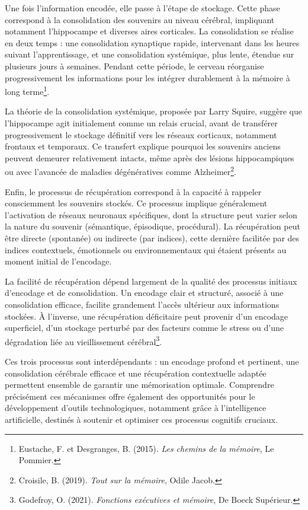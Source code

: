 \documentclass[12pt,a4paper]{report}
\begin{document}
Une fois l’information encodée, elle passe à l'étape de stockage. Cette phase correspond à la consolidation des souvenirs au niveau cérébral, impliquant notamment l'hippocampe et diverses aires corticales. La consolidation se réalise en deux temps : une consolidation synaptique rapide, intervenant dans les heures suivant l'apprentissage, et une consolidation systémique, plus lente, étendue sur plusieurs jours à semaines. Pendant cette période, le cerveau réorganise progressivement les informations pour les intégrer durablement à la mémoire à long terme\footnote{Eustache, F. et Desgranges, B. (2015). \textit{Les chemins de la mémoire}, Le Pommier.}.

La théorie de la consolidation systémique, proposée par Larry Squire, suggère que l'hippocampe agit initialement comme un relais crucial, avant de transférer progressivement le stockage définitif vers les réseaux corticaux, notamment frontaux et temporaux. Ce transfert explique pourquoi les souvenirs anciens peuvent demeurer relativement intacts, même après des lésions hippocampiques ou avec l’avancée de maladies dégénératives comme Alzheimer\footnote{Croisile, B. (2019). \textit{Tout sur la mémoire}, Odile Jacob.}.

Enfin, le processus de récupération correspond à la capacité à rappeler consciemment les souvenirs stockés. Ce processus implique généralement l'activation de réseaux neuronaux spécifiques, dont la structure peut varier selon la nature du souvenir (sémantique, épisodique, procédural). La récupération peut être directe (spontanée) ou indirecte (par indices), cette dernière facilitée par des indices contextuels, émotionnels ou environnementaux qui étaient présents au moment initial de l'encodage.

La facilité de récupération dépend largement de la qualité des processus initiaux d'encodage et de consolidation. Un encodage clair et structuré, associé à une consolidation efficace, facilite grandement l'accès ultérieur aux informations stockées. À l’inverse, une récupération déficitaire peut provenir d’un encodage superficiel, d’un stockage perturbé par des facteurs comme le stress ou d'une dégradation liée au vieillissement cérébral\footnote{Godefroy, O. (2021). \textit{Fonctions exécutives et mémoire}, De Boeck Supérieur.}.

Ces trois processus sont interdépendants : un encodage profond et pertinent, une consolidation cérébrale efficace et une récupération contextuelle adaptée permettent ensemble de garantir une mémorisation optimale. Comprendre précisément ces mécanismes offre également des opportunités pour le développement d'outils technologiques, notamment grâce à l’intelligence artificielle, destinés à soutenir et optimiser ces processus cognitifs cruciaux.
\end{document}
